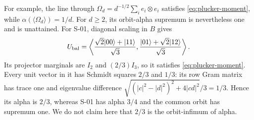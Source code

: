 For example, the line through
$\Omega_d=d^{-1/2}\sum_i e_i\otimes e_i$ satisfies
\eqref{eq:plucker-moment}, while $\alpha(\langle\Omega_d\rangle)=1/d$.
For $d\geq2$, its orbit-alpha supremum is nevertheless one and
is unattained. For S-01, diagonal scaling in $B$ gives
\[
 U_{\mathrm{bal}}=\left\langle
 {\sqrt2|00\rangle+|11\rangle\over\sqrt3},
 {|01\rangle+\sqrt2|12\rangle\over\sqrt3}\right\rangle.
\]
Its projector marginals are $I_2$ and $(2/3)I_3$, so it satisfies
\eqref{eq:plucker-moment}. Every unit vector in it has Schmidt
squares $2/3$ and $1/3$: its row Gram matrix has trace one and
eigenvalue difference
$\sqrt{(|c|^2-|d|^2)^2+4|cd|^2}/3=1/3$.
Hence its alpha is $2/3$, whereas S-01 has alpha $3/4$ and
the common orbit has supremum one. We do not claim here that
$2/3$ is the orbit-infimum of alpha.

